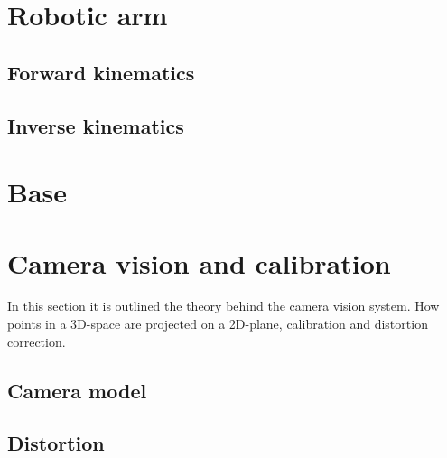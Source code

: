 \section*{Robotic arm}
\subsection*{Forward kinematics}
\subsection*{Inverse kinematics}
\section*{Base}

\section*{Camera vision and calibration}
In this section it is outlined the theory behind the camera vision system. 
How points in a 3D-space are projected on a 2D-plane, calibration and distortion correction. 
\subsection*{Camera model}
\subsection*{Distortion}